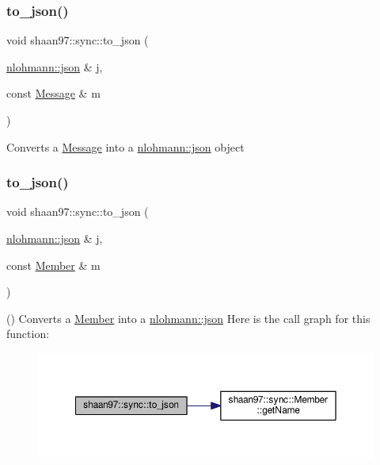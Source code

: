 \subsubsection{\texorpdfstring{to\+\_\+json()}{to\_json()}\hspace{0.1cm}{\footnotesize\ttfamily [1/2]}}
{\footnotesize\ttfamily void shaan97\+::sync\+::to\+\_\+json (\begin{DoxyParamCaption}\item[{\hyperlink{namespacenlohmann_a2bfd99e845a2e5cd90aeaf1b1431f474}{nlohmann\+::json} \&}]{j,  }\item[{const \hyperlink{structshaan97_1_1sync_1_1_message}{Message} \&}]{m }\end{DoxyParamCaption})}



Converts a {\ttfamily \hyperlink{structshaan97_1_1sync_1_1_message}{Message}} into a {\ttfamily \hyperlink{namespacenlohmann_a2bfd99e845a2e5cd90aeaf1b1431f474}{nlohmann\+::json} object} 

\mbox{\label{group___de_gaad90c8bd50725f5382dc2207225f52ee}} 
\subsubsection{\texorpdfstring{to\+\_\+json()}{to\_json()}\hspace{0.1cm}{\footnotesize\ttfamily [2/2]}}
{\footnotesize\ttfamily void shaan97\+::sync\+::to\+\_\+json (\begin{DoxyParamCaption}\item[{\hyperlink{namespacenlohmann_a2bfd99e845a2e5cd90aeaf1b1431f474}{nlohmann\+::json} \&}]{j,  }\item[{const \hyperlink{classshaan97_1_1sync_1_1_member}{Member} \&}]{m }\end{DoxyParamCaption})}

() Converts a {\ttfamily \hyperlink{classshaan97_1_1sync_1_1_member}{Member}} into a {\ttfamily \hyperlink{namespacenlohmann_a2bfd99e845a2e5cd90aeaf1b1431f474}{nlohmann\+::json}} Here is the call graph for this function\+:
\nopagebreak
\begin{figure}[H]
\begin{center}
\leavevmode
\includegraphics[width=350pt]{group___de_gaad90c8bd50725f5382dc2207225f52ee_cgraph}
\end{center}
\end{figure}


